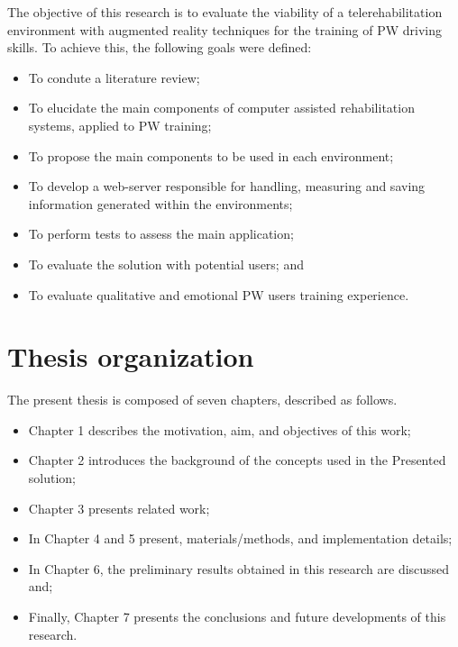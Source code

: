The objective of this research is to evaluate the viability of a telerehabilitation environment with augmented reality techniques for the training of PW driving skills. To achieve this, the following goals were defined:
\begin{itemize}
\item To condute a literature review;
\item To elucidate the main components of computer assisted rehabilitation systems, applied to PW training;
\item To propose the main components to be used in each environment;
\item To develop a web-server responsible for handling, measuring and saving information generated within the environments;
\item To perform tests to assess the main application;
\item To evaluate the solution with potential users; and
\item To evaluate qualitative and emotional PW users training experience.
\end{itemize}

\section{Thesis organization}

The present thesis is composed of seven chapters, described as follows.
\begin{itemize}
\item Chapter 1 describes the motivation, aim, and objectives of this work;
\item Chapter 2 introduces the background of the concepts used in the
Presented solution;
\item Chapter 3 presents related work;
\item In Chapter 4 and 5 present, materials/methods, and implementation details;
\item In Chapter 6, the preliminary results obtained in this research are discussed and;
\item Finally, Chapter 7 presents the conclusions and future developments of this research.
\end{itemize}